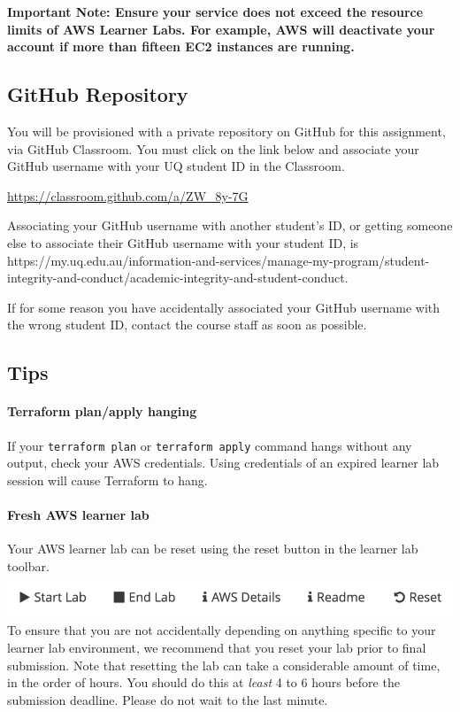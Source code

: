 \documentclass{csse4400}
\begin{document}
\noindent
\textbf{Important Note: Ensure your service does not exceed the resource limits of AWS Learner Labs. For example, AWS will deactivate your account if more than fifteen EC2 instances are running.}

\subsection{GitHub Repository}\label{sec:github}
You will be provisioned with a private repository on GitHub for this assignment, via GitHub Classroom. You must click on the link below and associate your GitHub username with your UQ student ID in the Classroom.

\url{https://classroom.github.com/a/ZW_8y-7G}

\noindent
Associating your GitHub username with another student's ID, or getting someone else to associate their GitHub username with your student ID, is  {https://my.uq.edu.au/information-and-services/manage-my-program/student-integrity-and-conduct/academic-integrity-and-student-conduct}.

If for some reason you have accidentally associated your GitHub username with the wrong student ID, contact the course staff as soon as possible.

\subsection{Tips}

\paragraph{Terraform plan/apply hanging}
If your \texttt{terraform plan} or \texttt{terraform apply} command hangs without any output, check your AWS credentials. Using credentials of an expired learner lab session will cause Terraform to hang.

\paragraph{Fresh AWS learner lab}
Your AWS learner lab can be reset using the reset button in the learner lab toolbar.
\includegraphics[width=\textwidth]{images/reset-button.png}
To ensure that you are not accidentally depending on anything specific to your learner lab environment, we recommend that you reset your lab prior to final submission. Note that resetting the lab can take a considerable amount of time, in the order of hours. You should do this at \textit{least} 4 to 6 hours before the submission deadline. Please do not wait to the last minute.
\end{document}
